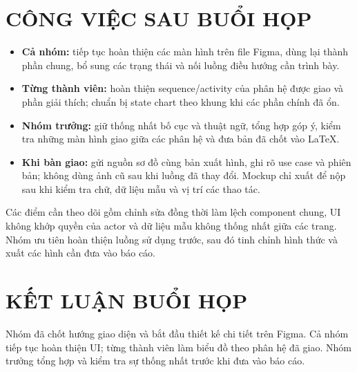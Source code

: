 \documentclass[10pt,a4paper]{article}
\begin{document}
\section{CÔNG VIỆC SAU BUỔI HỌP}
\begin{itemize}
  \item \textbf{Cả nhóm:} tiếp tục hoàn thiện các màn hình trên file Figma, dùng lại thành phần chung, bổ sung các trạng thái và nối luồng điều hướng cần trình bày.
  \item \textbf{Từng thành viên:} hoàn thiện sequence/activity của phân hệ được giao và phần giải thích; chuẩn bị state chart theo khung khi các phần chính đã ổn.
  \item \textbf{Nhóm trưởng:} giữ thống nhất bố cục và thuật ngữ, tổng hợp góp ý, kiểm tra những màn hình giao giữa các phân hệ và đưa bản đã chốt vào LaTeX.
  \item \textbf{Khi bàn giao:} gửi nguồn sơ đồ cùng bản xuất hình, ghi rõ use case và phiên bản; không dùng ảnh cũ sau khi luồng đã thay đổi. Mockup chỉ xuất để nộp sau khi kiểm tra chữ, dữ liệu mẫu và vị trí các thao tác.
\end{itemize}

Các điểm cần theo dõi gồm chỉnh sửa đồng thời làm lệch component chung, UI không khớp quyền của actor và dữ liệu mẫu không thống nhất giữa các trang. Nhóm ưu tiên hoàn thiện luồng sử dụng trước, sau đó tinh chỉnh hình thức và xuất các hình cần đưa vào báo cáo.

\section{KẾT LUẬN BUỔI HỌP}
Nhóm đã chốt hướng giao diện và bắt đầu thiết kế chi tiết trên Figma. Cả nhóm tiếp tục hoàn thiện UI; từng thành viên làm biểu đồ theo phân hệ đã giao. Nhóm trưởng tổng hợp và kiểm tra sự thống nhất trước khi đưa vào báo cáo.
\end{document}
